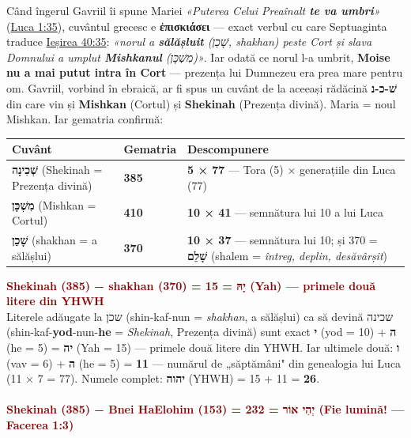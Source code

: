 \documentclass[12pt,a4paper,twoside,openany]{book}
\begin{document}
Când îngerul Gavriil îi spune Mariei \textit{«Puterea Celui Preaînalt \textbf{te va umbri}»} (\href{https://bibliaortodoxa.ro/carte.php?id=48\&cap=1\#35}{Luca 1:35}), cuvântul grecesc e \textbf{ἐπισκιάσει} — exact verbul cu care Septuaginta traduce \href{https://bibliaortodoxa.ro/carte.php?id=32\&cap=40\#35}{Ieșirea 40:35}: \textit{«norul a \textbf{sălășluit} (שָׁכַן, \textit{shakhan}) peste Cort și slava Domnului a umplut \textbf{Mishkanul} (מִשְׁכָּן)»}. Iar odată ce norul l-a umbrit, \textbf{Moise nu a mai putut intra în Cort} — prezența lui Dumnezeu era prea mare pentru om. Gavriil, vorbind în ebraică, ar fi spus un cuvânt de la aceeași rădăcină \textbf{שׁ-כ-נ} din care vin și \textbf{Mishkan} (Cortul) și \textbf{Shekinah} (Prezența divină). Maria = noul Mishkan. Iar gematria confirmă:

\begin{center}
\small
\begin{tabular}{L{4.5cm}L{1.0cm}L{9.4cm}}
\toprule
{}
\textbf{Cuvânt} & \textbf{Gematria} & \textbf{Descompunere} \\
\midrule
\textbf{שְׁכִינָה} (Shekinah = Prezența divină) & \textbf{385} & \textbf{5 × 77} — Tora (5) × generațiile din Luca (77) \\
\textbf{מִשְׁכָּן} (Mishkan = Cortul) & \textbf{410} & \textbf{10 × 41} — semnătura lui 10 a lui Luca \\
\textbf{שָׁכַן} (shakhan = a sălășlui) & \textbf{370} & \textbf{10 × 37} — semnătura lui 10; și 370 = \textbf{שָׁלֵם} (shalem = \textit{întreg, deplin, desăvârșit}) \\
\bottomrule
\end{tabular}
\end{center}
\normalsize
\textcolor{darkred}{\textbf{Shekinah (385) − shakhan (370) = 15 = יָהּ (Yah) — primele două litere din YHWH}} \\

Literele adăugate la שכן (shin-kaf-nun = \textit{shakhan}, a sălășlui) ca să devină שכינה (shin-kaf-\textbf{yod}-nun-\textbf{he} = \textit{Shekinah}, Prezența divină) sunt exact \textbf{י} (yod = 10) + \textbf{ה} (he = 5) = \textbf{יה} (Yah = 15) — primele două litere din YHWH. Iar ultimele două: \textbf{ו} (vav = 6) + \textbf{ה} (he = 5) = \textbf{11} — numărul de „săptămâni" din genealogia lui Luca (11 × 7 = 77). Numele complet: \textbf{יהוה} (YHWH) = 15 + 11 = \textbf{26}. \\
 \\

\textcolor{darkred}{\textbf{Shekinah (385) − Bnei HaElohim (153) = 232 = יְהִי אוֹר (Fie lumină! — Facerea 1:3)}} \\
\end{document}
